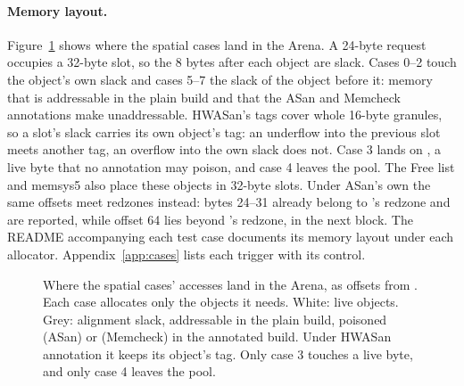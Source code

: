 \paragraph{Memory layout.} Figure~\ref{fig:offsets} shows where the spatial cases land in the Arena. A 24-byte request occupies a 32-byte slot, so the 8 bytes after each object are slack. Cases 0--2 touch the object's own slack and cases 5--7 the slack of the object before it: memory that is addressable in the plain build and that the ASan and Memcheck annotations make unaddressable. HWASan's tags cover whole 16-byte granules, so a slot's slack carries its own object's tag: an underflow into the previous slot meets another tag, an overflow into the own slack does not. Case 3 lands on , a live byte that no annotation may poison, and case 4 leaves the pool. The Free list and memsys5 also place these objects in 32-byte slots. Under ASan's own  the same offsets meet redzones instead: bytes 24--31 already belong to 's redzone and are reported, while offset 64 lies beyond 's redzone, in the next block. The README accompanying each test case documents its memory layout under each allocator. Appendix~\ref{app:cases} lists each trigger with its control.

\begin{figure}[!htbp]
\centering
{}
\caption{Where the spatial cases' accesses land in the Arena, as offsets from . Each case
allocates only the objects it needs. White: live objects. Grey: alignment slack, addressable in the plain build, poisoned (ASan) or  (Memcheck) in the annotated build. Under HWASan annotation it keeps its object's tag. Only case 3 touches a live byte, and only case 4 leaves the pool.}
\label{fig:offsets}
\end{figure}

